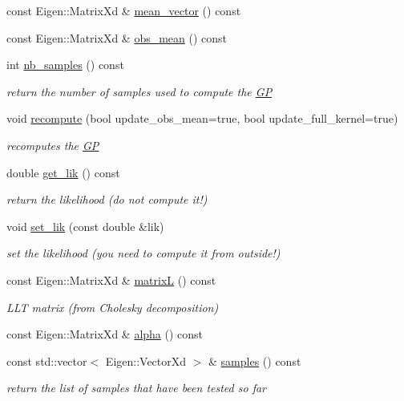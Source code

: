\begin{DoxyCompactItemize}
const Eigen\+::\+Matrix\+Xd \& \hyperlink{classlimbo_1_1model_1_1_g_p_ade0d93b847e3d112735b3e8143470a55}{mean\+\_\+vector} () const 
\item 
const Eigen\+::\+Matrix\+Xd \& \hyperlink{classlimbo_1_1model_1_1_g_p_aa9d3799fdcd71a8ccc19bc43932fa321}{obs\+\_\+mean} () const 
\item 
int \hyperlink{classlimbo_1_1model_1_1_g_p_ac490915c95cc78f6cd836f78e3638bf1}{nb\+\_\+samples} () const 
\begin{DoxyCompactList}\small\item\em return the number of samples used to compute the \hyperlink{classlimbo_1_1model_1_1_g_p}{G\+P} \end{DoxyCompactList}\item 
void \hyperlink{classlimbo_1_1model_1_1_g_p_aff675b6136bdee1b907a1ca1c76699b4}{recompute} (bool update\+\_\+obs\+\_\+mean=true, bool update\+\_\+full\+\_\+kernel=true)
\begin{DoxyCompactList}\small\item\em recomputes the \hyperlink{classlimbo_1_1model_1_1_g_p}{G\+P} \end{DoxyCompactList}\item 
double \hyperlink{classlimbo_1_1model_1_1_g_p_a794ed0eeda29aaa7afe303b5e72d3927}{get\+\_\+lik} () const 
\begin{DoxyCompactList}\small\item\em return the likelihood (do not compute it!) \end{DoxyCompactList}\item 
void \hyperlink{classlimbo_1_1model_1_1_g_p_a4dfc1807eb4f113191dbd3ae51c053ee}{set\+\_\+lik} (const double \&lik)
\begin{DoxyCompactList}\small\item\em set the likelihood (you need to compute it from outside!) \end{DoxyCompactList}\item 
const Eigen\+::\+Matrix\+Xd \& \hyperlink{classlimbo_1_1model_1_1_g_p_a6f3a88531cc874a3a0cae0c218b0cf0a}{matrix\+L} () const 
\begin{DoxyCompactList}\small\item\em L\+L\+T matrix (from Cholesky decomposition) \end{DoxyCompactList}\item 
const Eigen\+::\+Matrix\+Xd \& \hyperlink{classlimbo_1_1model_1_1_g_p_adab606218ab9ef0c35babf8d1cc16d81}{alpha} () const 
\item 
const std\+::vector$<$ Eigen\+::\+Vector\+Xd $>$ \& \hyperlink{classlimbo_1_1model_1_1_g_p_abaa15a2e503bac670dd1a35fb377aa23}{samples} () const 
\begin{DoxyCompactList}\small\item\em return the list of samples that have been tested so far \end{DoxyCompactList}\end{DoxyCompactItemize}


